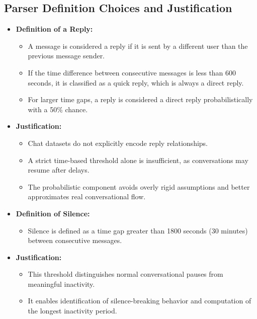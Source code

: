 \documentclass[11pt,a4paper]{article}
\begin{document}
\subsection{Parser Definition Choices and Justification}
\begin{itemize}
    \item \textbf{Definition of a Reply:}
    \begin{itemize}
        \item A message is considered a reply if it is sent by a different user than the previous message sender.
        \item If the time difference between consecutive messages is less than 600 seconds, it is classified as a quick reply, which is always a direct reply.
        \item For larger time gaps, a reply is considered a direct reply probabilistically with a 50\% chance.
    \end{itemize}

    \item \textbf{Justification:}
    \begin{itemize}
        \item Chat datasets do not explicitly encode reply relationships.
        \item A strict time-based threshold alone is insufficient, as conversations may resume after delays.
        \item The probabilistic component avoids overly rigid assumptions and better approximates real conversational flow.
    \end{itemize}

    \item \textbf{Definition of Silence:}
    \begin{itemize}
        \item Silence is defined as a time gap greater than 1800 seconds (30 minutes) between consecutive messages.
    \end{itemize}

    \item \textbf{Justification:}
    \begin{itemize}
        \item This threshold distinguishes normal conversational pauses from meaningful inactivity.
        \item It enables identification of silence-breaking behavior and computation of the longest inactivity period.
    \end{itemize}


\end{itemize}
\end{document}
